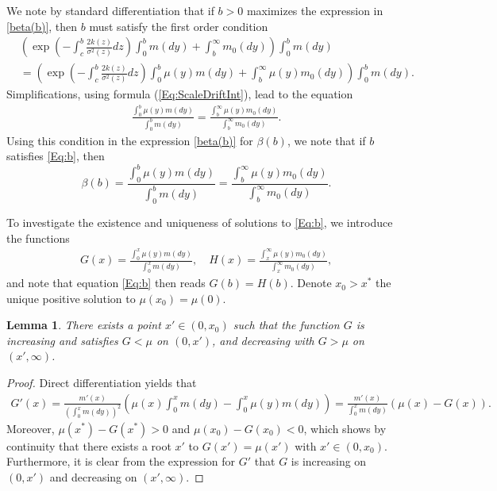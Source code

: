 \documentclass[12pt]{article}
\newtheorem{lemma}[theorem]{Lemma}
\begin{document}
 We note by standard differentiation that if $b>0$ maximizes the expression in \eqref{beta(b)}, then $b$ must satisfy the first order condition
 \begin{align*}
&\left(\exp\left(-\int_c^b\frac{2k(z)}{\sigma^2(z)}dz\right)\int_0^{b}m(dy) + \int_{b}^{\infty} m_0(dy)\right)\int_0^{b}m(dy)\\
& =
 \left(\exp\left(-\int_c^b\frac{2k(z)}{\sigma^2(z)}dz\right)\int_0^{b}\mu(y)m(dy) + \int_{b}^{\infty} \mu(y)m_0(dy)\right)\int_0^b m(dy).
 \end{align*}
Simplifications, using formula (\ref{Eq:ScaleDriftInt}), lead to the equation
\begin{align} \label{Eq:b}
      \frac{\int_0^{b} \mu(y)m(dy)}{\int_0^{b}m(dy)}=  \frac{\int_{b}^{\infty} \mu(y)m_0(dy)}{\int_{b}^{\infty} m_0(dy)}.
\end{align}
Using this condition in the expression \eqref{beta(b)} for $\beta(b)$, we note that if $b$ satisfies \eqref{Eq:b}, then 
\begin{equation*}
    \beta(b) = \frac{\int_0^{b} \mu(y)m(dy)}{\int_0^{b}m(dy)} =\frac{\int_{b}^{\infty} \mu(y)m_0(dy)}{\int_{b}^{\infty} m_0(dy)}.
\end{equation*}

To investigate the existence and uniqueness of solutions to \eqref{Eq:b}, we introduce the functions
\begin{align*}
    G(x) = \frac{\int_0^{x} \mu(y)m(dy)}{\int_0^{x}m(dy)}, \quad
    H(x) =\frac{\int_{x}^{\infty} \mu(y)m_0(dy)}{\int_{x}^{\infty} m_0(dy)},
\end{align*}
and note that equation \eqref{Eq:b} then reads $G(b)=H(b)$.
Denote $x_0>x^*$ the unique positive solution to $\mu(x_0)=\mu(0)$.


\begin{lemma} \label{Lemma: Gshape}
    There exists a point $x'\in(0,x_0)$ such that the function $G$ 
    is increasing and satisfies $G<\mu$ on $(0,x')$, and decreasing with $G>\mu$ on $(x',\infty)$.    
\end{lemma}

\begin{proof}
    Direct differentiation yields that
    \begin{align*}
        G'(x) = \frac{m'(x)}{\left( \int_0^x m(dy) \right)^2} \left( \mu(x) \int_0^x m(dy)- \int_0^x \mu(y)m(dy) \right) 
        = \frac{m'(x)}{ \int_0^x m(dy)}(\mu(x)-G(x)). 
    \end{align*}
    Moreover, $\mu(x^*)-G(x^*) > 0$ and $\mu(x_0)-G(x_0) < 0$, which shows by continuity that there exists a root $x'$ to $G(x') = \mu(x')$ with $x' \in (0, x_0)$. Furthermore, it is clear from the expression for $G'$ that $G$ is increasing on $(0,x')$ and decreasing on $(x',\infty)$.
\end{proof}
\end{document}
